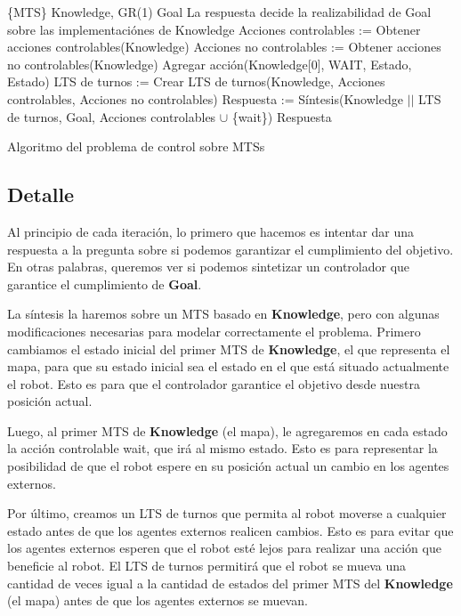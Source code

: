 \begin{algorithm}
\begin{algorithmic}
\REQUIRE \{MTS\} Knowledge, GR(1) Goal
\ENSURE La respuesta decide la realizabilidad de Goal sobre las implementaciónes de Knowledge
\STATE Acciones controlables := Obtener acciones controlables(Knowledge)
\STATE Acciones no controlables := Obtener acciones no controlables(Knowledge)
	\STATE Agregar acción(Knowledge[0], WAIT, Estado, Estado)
\ENDFOR
\STATE LTS de turnos := Crear LTS de turnos(Knowledge, Acciones controlables, Acciones no controlables)
\STATE Respuesta := Síntesis(Knowledge $||$ LTS de turnos, Goal, Acciones controlables $\cup$ \{wait\})
\RETURN Respuesta
\end{algorithmic}
\caption{Algoritmo del problema de control sobre MTSs}
\end{algorithm}

\newpage

\subsection{Detalle}

Al principio de cada iteración, lo primero que hacemos es intentar dar una respuesta a la pregunta sobre si podemos garantizar el cumplimiento del objetivo. 
En otras palabras, queremos ver si podemos sintetizar un controlador que garantice el cumplimiento de \textbf{Goal}.

La síntesis la haremos sobre un MTS basado en \textbf{Knowledge}, pero con algunas modificaciones necesarias para modelar correctamente el problema. 
Primero cambiamos el estado inicial del primer MTS de \textbf{Knowledge}, el que representa el mapa, para que su estado inicial sea el estado en el que está 
situado actualmente el robot. Esto es para que el controlador garantice el objetivo desde nuestra posición actual.

Luego, al primer MTS de \textbf{Knowledge} (el mapa), le agregaremos en cada estado la acción controlable wait, que irá al mismo estado. 
Esto es para representar la posibilidad de que el robot espere en su posición actual un cambio en los agentes externos.

Por último, creamos un LTS de turnos que permita al robot moverse a cualquier estado antes de que los agentes externos realicen cambios. Esto es para evitar que los 
agentes externos esperen que el robot esté lejos para realizar una acción que beneficie al robot. El LTS de turnos permitirá que el robot se mueva una cantidad 
de veces igual a la cantidad de estados del primer MTS del \textbf{Knowledge} (el mapa) antes de que los agentes externos se muevan.

